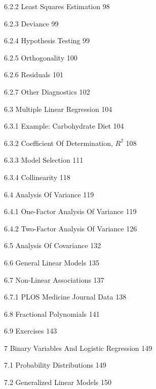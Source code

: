 6.2.2 Least Squares Estimation 98



6.2.3 Deviance 99



6.2.4 Hypothesis Testing 99



6.2.5 Orthogonality 100



6.2.6 Residuals 101



6.2.7 Other Diagnostics 102



6.3 Multiple Linear Regression 104



6.3.1 Example: Carbohydrate Diet 104



6.3.2 Coefficient Of Determination, $R^2$ 108



6.3.3 Model Selection 111



6.3.4 Collinearity 118



6.4 Analysis Of Variance 119



6.4.1 One-Factor Analysis Of Variance 119



6.4.2 Two-Factor Analysis Of Variance 126



6.5 Analysis Of Covariance 132



6.6 General Linear Models 135



6.7 Non-Linear Associations 137



6.7.1 PLOS Medicine Journal Data 138



6.8 Fractional Polynomials 141



6.9 Exercises 143



7 Binary Variables And Logistic Regression 149



7.1 Probability Distributions 149



7.2 Generalized Linear Models 150



